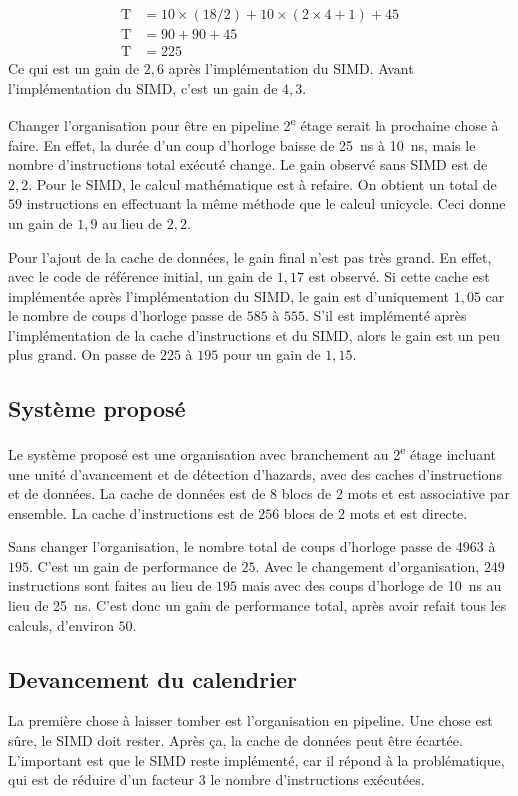 \documentclass[a11paper]{article}
\begin{document}
\begin{align}
  \text{T} &= 10\times(18/2) + 10\times(2\times4+1) + 45 \\
  \text{T} &= 90 + 90 + 45 \\
  \text{T} &= 225
\end{align}
Ce qui est un gain de $2{,}6$ après l'implémentation du SIMD. Avant
l'implémentation du SIMD, c'est un gain de $4{,}3$.

Changer l'organisation pour être en pipeline 2\textsuperscript{e} étage serait la prochaine chose
à faire. En effet, la durée d'un coup d'horloge baisse de \SI{25}{\nano\s} à \SI{10}{\nano\s}, mais
le nombre d'instructions total exécuté change. Le gain observé sans SIMD est de
$2{,}2$. Pour le SIMD, le calcul mathématique est à refaire. On obtient un total
de $59$ instructions en effectuant la même méthode que le calcul unicycle. Ceci
donne un gain de $1{,}9$ au lieu de $2{,}2$.

Pour l'ajout de la cache de données, le gain final n'est pas très grand. En
effet, avec le code de référence initial, un gain de $1{,}17$ est observé. Si
cette cache est implémentée après l'implémentation du SIMD, le gain est
d'uniquement $1{,}05$ car le nombre de coups d'horloge passe de $585$ à $555$.
S'il est implémenté après l'implémentation de la cache d'instructions et du
SIMD, alors le gain est un peu plus grand. On passe de $225$ à $195$ pour un gain
de $1{,}15$.

\subsection{Système proposé}
Le système proposé est une organisation avec branchement au 2\textsuperscript{e} étage incluant
une unité d'avancement et de détection d'hazards, avec des caches d'instructions
et de données. La cache de données est de $8$ blocs de $2$ mots et est
associative par ensemble. La cache d'instructions est de $256$ blocs de $2$ mots
et est directe.

Sans changer l'organisation, le nombre total de coups d'horloge passe de $4963$
à $195$. C'est un gain de performance de $25$. Avec le changement
d'organisation, $249$ instructions sont faites au lieu de $195$ mais avec des
coups d'horloge de \SI{10}{\nano\s} au lieu de \SI{25}{\nano\s}. C'est donc un
gain de performance total, après avoir refait tous les calculs,
d'environ $50$.

\subsection{Devancement du calendrier}
La première chose à laisser tomber est l'organisation en pipeline. Une chose est
sûre, le SIMD doit rester. Après ça, la cache de données peut être écartée.
L'important est que le SIMD reste implémenté, car il répond à la problématique,
qui est de réduire d’un facteur $3$ le nombre d'instructions exécutées.
\end{document}
